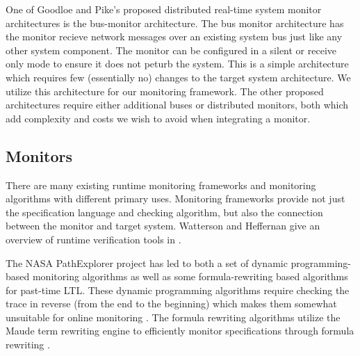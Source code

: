 \documentclass[]{llncs}
\begin{document}
One of Goodloe and Pike's proposed distributed real-time system monitor architectures is the bus-monitor architecture.
The bus monitor architecture has the monitor recieve network messages over an existing system bus just like any other system component. 
The monitor can be configured in a silent or receive only mode to ensure it does not peturb the system. 
This is a simple architecture which requires few (essentially no) changes to the target system architecture. We utilize this architecture for our monitoring framework. The other proposed architectures require either additional buses or distributed monitors, both which add complexity and costs we wish to avoid when integrating a monitor. %

\subsection{Monitors}
There are many existing runtime monitoring frameworks and monitoring algorithms with different primary uses. Monitoring frameworks provide not just the specification language and checking algorithm, but also the connection between the monitor and target system.
Watterson and Heffernan give an overview of runtime verification tools in \cite{Watterson2007}. 

The NASA PathExplorer project has led to both a set of dynamic programming-based monitoring algorithms as well as some formula-rewriting based algorithms \cite{Havelund2004} for past-time LTL. These dynamic programming algorithms require checking the trace in reverse (from the end to the beginning) which makes them somewhat unsuitable for online monitoring \cite{Havelund2002}. The formula rewriting algorithms utilize the Maude term rewriting engine to efficiently monitor specifications through formula rewriting \cite{Rosu2005}. 
\end{document}
